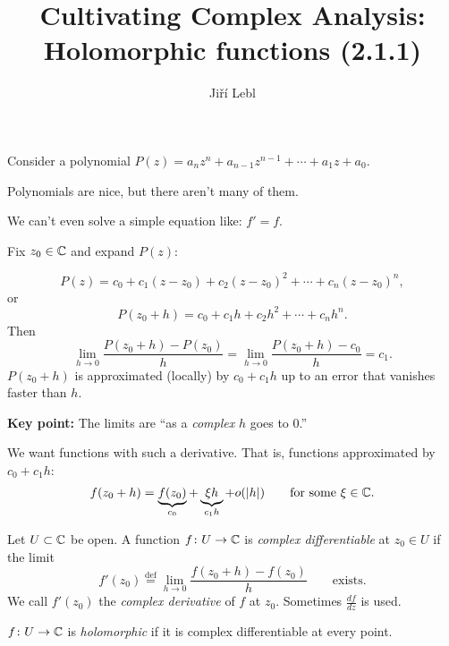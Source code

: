 \documentclass[10pt,aspectratio=169]{beamer}
\author{Ji\v{r}\'i Lebl}
\institute[OSU]{%
Departemento pri Matematiko de Oklahoma {\^S}tata Universitato}
\title{Cultivating Complex Analysis:\\%
Holomorphic functions (2.1.1)}
\date{}
\begin{document}
\begin{frame}
\titlepage
\end{frame}

\begin{frame}

\section{}
Consider a polynomial
$P(z) = a_n z^n + a_{n-1} z^{n-1} + \cdots + a_1 z + a_0$.

\medskip
\pause

Polynomials are nice, but there aren't many of them.

\medskip
\pause

We can't even solve a simple equation like: $f'=f$.

\medskip
\pause

Fix $z_0 \in {\mathbb{C}}$ and expand $P(z)$:

\[
P(z) = c_0 + c_1 (z-z_0) + c_2 {(z-z_0)}^2 + \cdots + c_n {(z-z_0)}^n ,
\]
\pause
or
\[
P(z_0+h) = c_0 + c_1 h + c_2 h^2 + \cdots + c_n h^n .
\]
\pause
Then
\[
\lim_{h \to 0} \frac{P(z_0+h) - P(z_0)}{h} =
\lim_{h \to 0} \frac{P(z_0+h) - c_0}{h} = c_1 .
\]
\pause
$P(z_0+h)$ is approximated (locally) by $c_0 + c_1 h$
up to an error that vanishes faster than $h$.

\medskip
\pause

\textbf{Key point:} The limits are ``as a \emph{complex} $h$ goes to $0$.''

\end{frame}

\begin{frame}
We want functions with such a derivative.  That is, functions approximated
by $c_0 + c_1 h$:
\[
f(z_0+h) = \underbrace{f(z_0)}_{c_0} + \underbrace{\xi h}_{c_1 h} + o(\lvert {h} \rvert)
\qquad \text{for some } \xi \in {\mathbb{C}} .
\]

\medskip
\pause

\begin{definition}
Let $U \subset {\mathbb{C}}$ be open.
A function
$f \colon U \to {\mathbb{C}}$ 
is \emph{complex differentiable} at $z_0 \in U$ if
the limit
\[
f'(z_0) \overset{\text{def}}{=}
\lim_{h \to 0} \frac{f(z_0+h) - f(z_0)}{h}
\qquad \text{exists.}
\]
\pause
We call $f'(z_0)$ the \emph{complex derivative} of $f$
at $z_0$.  Sometimes $\frac{df}{dz}$ is used.
\pause
\medskip

$f \colon U \to {\mathbb{C}}$ is
\emph{holomorphic}
if it is complex differentiable at every point.
\end{definition}

\end{frame}
\end{document}
